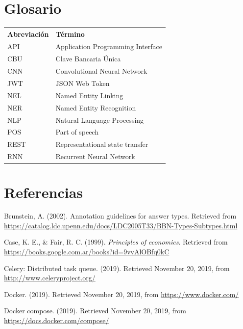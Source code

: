 \documentclass[12pt,a4paper,]{scrartcl}
\begin{document}
\newpage

\hypertarget{glosario}{%
\section*{Glosario}\label{glosario}}

\begin{tabular}{ll}
\toprule
Abreviación & Término\\
\midrule
API & Application Programming Interface\\
CBU & Clave Bancaria Única\\
CNN & Convolutional Neural Network\\
JWT & JSON Web Token\\
NEL & Named Entity Linking\\
\addlinespace
NER & Named Entity Recognition\\
NLP & Natural Language Processing\\
POS & Part of speech\\
REST & Representational state transfer\\
RNN & Recurrent Neural Network\\
\bottomrule
\end{tabular}

\hypertarget{referencias}{%
\section*{Referencias}\label{referencias}}

\hypertarget{refs}{}
\leavevmode\hypertarget{ref-brunstein2002}{}%
Brunstein, A. (2002). Annotation guidelines for answer types. Retrieved from \url{https://catalog.ldc.upenn.edu/docs/LDC2005T33/BBN-Types-Subtypes.html}

\leavevmode\hypertarget{ref-lawOfDiminishingReturns}{}%
Case, K. E., \& Fair, R. C. (1999). \emph{Principles of economics}. Retrieved from \url{https://books.google.com.ar/books?id=9vvAlOBfq0kC}

\leavevmode\hypertarget{ref-celery}{}%
Celery: Distributed task queue. (2019). Retrieved November 20, 2019, from \url{http://www.celeryproject.org/}

\leavevmode\hypertarget{ref-docker}{}%
Docker. (2019). Retrieved November 20, 2019, from \url{https://www.docker.com/}

\leavevmode\hypertarget{ref-dockercompose}{}%
Docker compose. (2019). Retrieved November 20, 2019, from \url{https://docs.docker.com/compose/}
\end{document}
